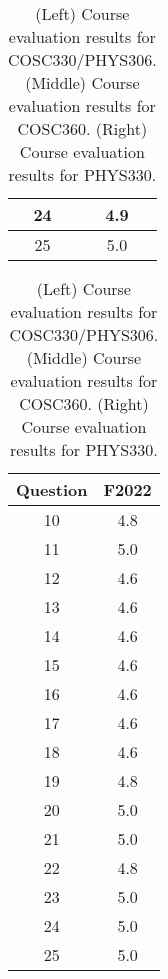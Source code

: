 \documentclass[../../main.tex]{subfiles}
\begin{document}
\begin{table}
\begin{tabular}{| c | c |}
24 & 4.9 \\ \hline
25 & 5.0 \\ \hline
\hline
\end{tabular}
\begin{tabular}{| c | c |}
\hline
\hline
Question & F2022 \\ \hline
10 & 4.8 \\ \hline
11 & 5.0 \\ \hline
12 & 4.6 \\ \hline
13 & 4.6 \\ \hline
14 & 4.6 \\ \hline
15 & 4.6 \\ \hline
16 & 4.6 \\ \hline
17 & 4.6 \\ \hline
18 & 4.6 \\ \hline
19 & 4.8 \\ \hline
20 & 5.0 \\ \hline
21 & 5.0 \\ \hline
22 & 4.8 \\ \hline
23 & 5.0 \\ \hline
24 & 5.0 \\ \hline
25 & 5.0 \\ \hline
\hline
\end{tabular}
\caption{\label{tab:adv_eval} (Left) Course evaluation results for COSC330/PHYS306.  (Middle) Course evaluation results for COSC360. (Right) Course evaluation results for PHYS330.}
\end{table}
\end{document}
